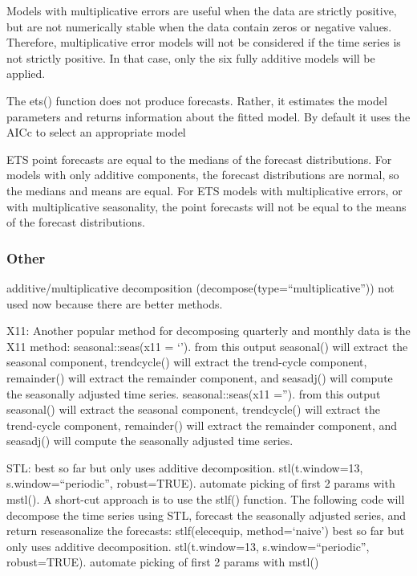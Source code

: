 \documentclass[]{book}
\begin{document}
Models with multiplicative errors are useful when the data are strictly
positive, but are not numerically stable when the data contain zeros or
negative values. Therefore, multiplicative error models will not be
considered if the time series is not strictly positive. In that case,
only the six fully additive models will be applied.

The ets() function does not produce forecasts. Rather, it estimates the
model parameters and returns information about the fitted model. By
default it uses the AICc to select an appropriate model

ETS point forecasts are equal to the medians of the forecast
distributions. For models with only additive components, the forecast
distributions are normal, so the medians and means are equal. For ETS
models with multiplicative errors, or with multiplicative seasonality,
the point forecasts will not be equal to the means of the forecast
distributions.

\subsubsection{Other}\label{other-2}

additive/multiplicative decomposition
(decompose(type=``multiplicative'')) not used now because there are
better methods.

X11: Another popular method for decomposing quarterly and monthly data
is the X11 method: seasonal::seas(x11 = `'). from this output seasonal()
will extract the seasonal component, trendcycle() will extract the
trend-cycle component, remainder() will extract the remainder component,
and seasadj() will compute the seasonally adjusted time series.
seasonal::seas(x11 =''). from this output seasonal() will extract the
seasonal component, trendcycle() will extract the trend-cycle component,
remainder() will extract the remainder component, and seasadj() will
compute the seasonally adjusted time series.

STL: best so far but only uses additive decomposition. stl(t.window=13,
s.window=``periodic'', robust=TRUE). automate picking of first 2 params
with mstl(). A short-cut approach is to use the stlf() function. The
following code will decompose the time series using STL, forecast the
seasonally adjusted series, and return reseasonalize the forecasts:
stlf(elecequip, method=`naive') best so far but only uses additive
decomposition. stl(t.window=13, s.window=``periodic'', robust=TRUE).
automate picking of first 2 params with mstl()
\end{document}
